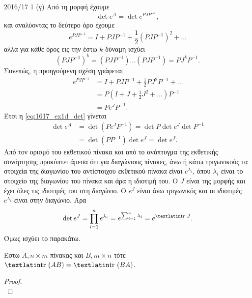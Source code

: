 \documentclass[a4paper,11pt]{article}
\begin{document}
\begin{solution}{2016/17 1}
    (γ) Από τη μορφή  έχουμε
    \begin{equation}\label{eq:1617_ex1d_det}
        \det e^A = \det e^{PJP^{-1}},
    \end{equation}
    και αναλύοντας το δεύτερο όρο έχουμε
    \begin{equation*}
        e^{PJP^{-1}} = I + PJP^{-1} + \frac{1}{2}
        \left( PJP^{-1} \right)^2 + \dots
    \end{equation*}
    αλλά για κάθε όρος εις την έστω \( k \) δύναμη ισχύει
    \begin{equation*}
        \left( PJP^{-1} \right)^k = (PJP^{-1}) \dots(PJP^{-1}) = PJ^kP^{-1}.
    \end{equation*}
    Συνεπώς, η προηγούμενη σχέση γράφεται
    \begin{align*}
        e^{PJP^{-1}} &= I + PJP^{-1} + \frac{1}{2}
        PJ^2P^{-1} + \dots \\
        &= P\left( I + J + \frac{1}{2}
        J^2 + \dots\right)P^{-1} \\
        &= Pe^{J}P^{-1}.
    \end{align*}
    Έτσι η \eqref{eq:1617_ex1d_det} γίνεται
    \begin{align*}
        \det e^A &= \det{(Pe^JP^{-1})} = \det{P} \det{e^J} \det{P^{-1}} \\
        &= \det{(PP^{-1})}\det{e^J} = \det{e^J}.
    \end{align*}
    Από τον ορισμό του εκθετικού πίνακα και από το ανάπτυγμα 
    της εκθετικής συνάρτησης προκύπτει άμεσα ότι για διαγώνιους πίνακες, άνω ή κάτω
    τριγωνικούς τα στοιχεία της διαγωνίου του αντίστοιχου εκθετικού πίνακα
    είναι \( e^{\lambda_i} \), όπου \( \lambda_i \) είναι το στοιχείο της
    διαγωνίου του πίνακα και άρα η ιδιοτιμή του.  Ο \( J \) είναι της μορφής
     και έχει όλες τις ιδιοτιμές του στη διαγώνιο. Ο \( e^J \) είναι άνω
    τριγωνικός και οι ιδιοτιμές \( e^{\lambda_i} \) είναι στην διαγώνιο. Άρα
    \begin{equation*}
        \det{e^J} = \prod_{i=1}^n e^{\lambda_{i}} =
            e^{\sum_{i=1}^n \lambda_{i}} = e^{\text{\tl{tr }}J}.
    \end{equation*}
    Όμως ισχύει το παρακάτω.
    \begin{lemma}
        Έστω \( A, n \times m \) πίνακας και \( B, m \times n \) τότε \(
        \text{\tl{tr }}(AB) = \text{\tl{tr }}(BA) \).
    \end{lemma}
    \begin{proof}
        \begin{equation*}

\end{equation*}
\end{proof}
\end{solution}
\end{document}
